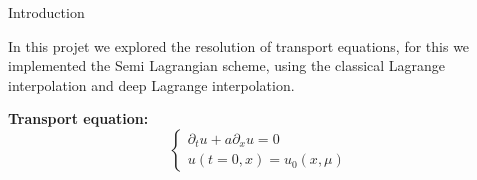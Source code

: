 \begin{frame}{Introduction}

    In this projet we explored the resolution of transport equations, for this we implemented the Semi Lagrangian  
    scheme, using the classical Lagrange interpolation and deep Lagrange interpolation.
    
    \vspace{0.5cm}
    \textbf{Transport equation:}
    \[
    \begin{cases}
    \partial_t u + a \partial_x u = 0 \\
    u(t=0, x) = u_0(x, \mu)
    \end{cases}
    \]

\end{frame}
